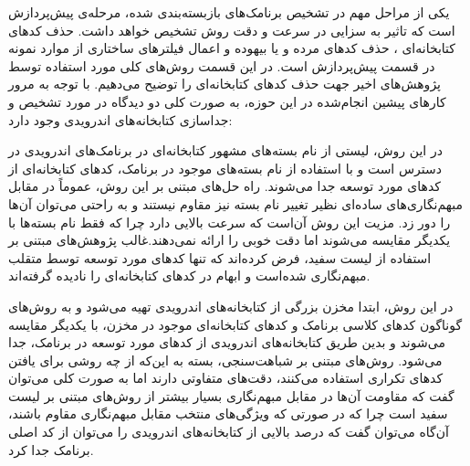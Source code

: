 یکی از مراحل مهم در تشخیص برنامک‌های بازبسته‌بندی شده، مرحله‌ی پیش‌پردازش  است که تاثیر به سزایی در سرعت و دقت روش تشخیص خواهد داشت. حذف کد‌های کتابخانه‌ای ، حذف کد‌های مرده و یا بیهوده و اعمال فیلتر‌های ساختاری از موارد نمونه در قسمت پیش‌پردازش است. در این قسمت روش‌های کلی مورد استفاده توسط پژوهش‌های اخیر جهت حذف کد‌های کتابخانه‌ای را توضیح می‌دهیم. با توجه به مرور کار‌های پیشین انجام‌شده در این حوزه، به صورت کلی دو دیدگاه در مورد تشخیص و جداسازی کتابخانه‌های اندرویدی وجود دارد:

  در این روش، لیستی از نام بسته‌های مشهور کتابخانه‌ای در برنامک‌های اندرویدی در دسترس است و با استفاده از نام بسته‌های موجود در برنامک، کد‌های کتابخانه‌ای از کد‌های مورد توسعه جدا می‌شوند. راه‌ حل‌های مبتنی بر این روش، عموماً در مقابل مبهم‌نگاری‌های ساده‌ای نظیر تغییر نام بسته نیز مقاوم نیستند و به راحتی می‌توان آن‌ها را دور زد. مزیت این روش آن‌است که سرعت بالایی دارد چرا که فقط نام بسته‌ها با یکدیگر مقایسه می‌شوند اما دقت خوبی را ارائه نمی‌دهند.غالب پژوهش‌های مبتنی بر استفاده از لیست سفید، فرض کرده‌اند که تنها کد‌های مورد توسعه توسط متقلب مبهم‌نگاری شده‌است و ابهام در کد‌های کتابخانه‌ای را نادیده گرفته‌اند.

  در این روش، ابتدا مخزن بزرگی از کتابخانه‌های اندرویدی تهیه می‌شود و به روش‌های گوناگون کد‌های کلاسی برنامک و کد‌های کتابخانه‌ای موجود در مخزن، با یکدیگر مقایسه می‌شوند و بدین طریق کتابخانه‌های اندرویدی از کد‌های مورد توسعه در برنامک، جدا می‌شود. روش‌های مبتنی بر شباهت‌سنجی، بسته به این‌که از چه روشی برای یافتن کد‌های تکراری استفاده می‌کنند، دقت‌های متفاوتی دارند اما به صورت کلی می‌توان گفت که مقاومت آن‌ها در مقابل مبهم‌نگاری بسیار بیشتر از روش‌های مبتنی بر لیست سفید است چرا که در صورتی که ویژگی‌های منتخب مقابل مبهم‌نگاری مقاوم باشند، آن‌گاه می‌توان گفت که درصد بالایی از کتابخانه‌های اندرویدی را می‌توان از کد اصلی برنامک جدا کرد.


